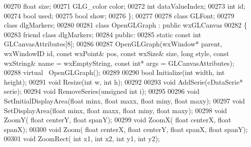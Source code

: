 \begin{DoxyCode}
00270     \textcolor{keywordtype}{float} size;
00271     GLG_color color;
00272     \textcolor{keywordtype}{int} dataValueIndex;
00273     \textcolor{keywordtype}{int} id;
00274     \textcolor{keywordtype}{bool} used;
00275     \textcolor{keywordtype}{bool} show;
00276 \};
00277 
00278 \textcolor{keyword}{class }GLFont;
00279 \textcolor{keyword}{class }dlgMarkers;
00280 
00281 \textcolor{keyword}{class }OpenGLGraph : \textcolor{keyword}{public} wxGLCanvas
00282 \{
00283 \textcolor{keyword}{friend} \textcolor{keyword}{class }dlgMarkers;
00284 \textcolor{keyword}{public}:
00285     \textcolor{keyword}{static} \textcolor{keyword}{const} \textcolor{keywordtype}{int} GLCanvasAttributes[8];
00286 
00287     OpenGLGraph(wxWindow* parent,  wxWindowID \textcolor{keywordtype}{id}, \textcolor{keyword}{const} wxPoint& pos, \textcolor{keyword}{const} wxSize& 
      size, \textcolor{keywordtype}{long} style, \textcolor{keyword}{const} wxString& name = wxEmptyString, \textcolor{keyword}{const} \textcolor{keywordtype}{int}* args = GLCanvasAttributes);
00288     \textcolor{keyword}{virtual} ~OpenGLGraph();
00289 
00290     \textcolor{keywordtype}{bool} Initialize(\textcolor{keywordtype}{int} width, \textcolor{keywordtype}{int} height);
00291     \textcolor{keywordtype}{void} Resize(\textcolor{keywordtype}{int} w, \textcolor{keywordtype}{int} h);
00292 
00293     \textcolor{keywordtype}{void} AddSerie(cDataSerie* serie);
00294     \textcolor{keywordtype}{void} RemoveSeries(\textcolor{keywordtype}{unsigned} \textcolor{keywordtype}{int} i);
00295 
00296     \textcolor{keywordtype}{void} SetInitialDisplayArea(\textcolor{keywordtype}{float} minx, \textcolor{keywordtype}{float} maxx, \textcolor{keywordtype}{float} miny, \textcolor{keywordtype}{float} maxy);
00297     \textcolor{keywordtype}{void} SetDisplayArea(\textcolor{keywordtype}{float} minx, \textcolor{keywordtype}{float} maxx, \textcolor{keywordtype}{float} miny, \textcolor{keywordtype}{float} maxy);
00298     \textcolor{keywordtype}{void} ZoomY( \textcolor{keywordtype}{float} centerY, \textcolor{keywordtype}{float} spanY);
00299     \textcolor{keywordtype}{void} ZoomX( \textcolor{keywordtype}{float} centerX, \textcolor{keywordtype}{float} spanX);
00300     \textcolor{keywordtype}{void} Zoom( \textcolor{keywordtype}{float} centerX, \textcolor{keywordtype}{float} centerY, \textcolor{keywordtype}{float} spanX, \textcolor{keywordtype}{float} spanY);
00301     \textcolor{keywordtype}{void} ZoomRect( \textcolor{keywordtype}{int} x1, \textcolor{keywordtype}{int} x2, \textcolor{keywordtype}{int} y1, \textcolor{keywordtype}{int} y2);

\end{DoxyCode}
